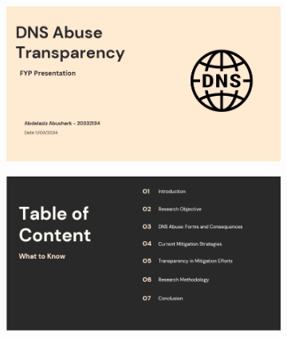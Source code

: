 \begin{figure}[H]
  \centering
  \begin{subfigure}[b]{0.55\linewidth}
    \includegraphics[width=\linewidth]{appendix/PRE1.png}
    \label{fig:left}
  \end{subfigure}
  \hfill %
  \begin{subfigure}[b]{0.55\linewidth}
    \includegraphics[width=\linewidth]{appendix/PRE2.png}
    \label{fig:right}
  \end{subfigure}
  \label{fig:images}
\end{figure}

